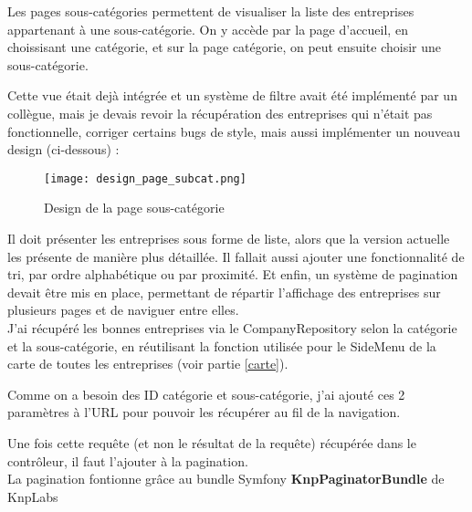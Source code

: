 

Les pages sous-catégories permettent de visualiser la liste des entreprises appartenant à une sous-catégorie. 
On y accède par la page d'accueil, en choissisant une catégorie, et sur la page catégorie, on peut ensuite choisir une sous-catégorie.

Cette vue était dejà intégrée et un système de filtre avait été implémenté par un collègue, mais je devais revoir la récupération des entreprises qui n'était pas fonctionnelle, corriger certains bugs de style, mais aussi implémenter un nouveau design (ci-dessous) :

\begin{figure}[H]
    \texttt{[image: design\_page\_subcat.png]}
    \caption{Design de la page sous-catégorie}
\end{figure}

Il doit présenter les entreprises sous forme de liste, alors que la version actuelle les présente de manière plus détaillée. 
Il fallait aussi ajouter une fonctionnalité de tri, par ordre alphabétique ou par proximité.
Et enfin, un système de pagination devait être mis en place, permettant de répartir l'affichage des entreprises sur plusieurs pages et de naviguer entre elles.\\

J'ai récupéré les bonnes entreprises via le CompanyRepository selon la catégorie et la sous-catégorie, en réutilisant la fonction utilisée pour le SideMenu de la carte de toutes les entreprises (voir partie \ref{carte}).

Comme on a besoin des ID catégorie et sous-catégorie, j'ai ajouté ces 2 paramètres à l'URL pour pouvoir les récupérer au fil de la navigation.

Une fois cette requête (et non le résultat de la requête) récupérée dans le contrôleur, il faut l'ajouter à la pagination.\\

La pagination fontionne grâce au bundle Symfony \textbf{KnpPaginatorBundle} de KnpLabs

